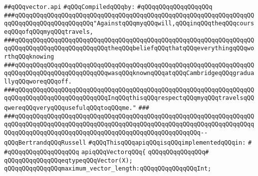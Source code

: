 \label{src/lib/std/src/vector.api}
\verb|##qQQqvector.api|\newline
\newline
\verb|#qQQqCompiledqQQqby:|\newline
\verb|#qQQqqQQqqQQqqQQqqQQq|\newline
\newline
\newline
\newline
\verb|###qQQqqQQqqQQqqQQqqQQqqQQqqQQqqQQqqQQqqQQqqQQqqQQqqQQqqQQqqQQqqQQqqQQqqQQqqQQqqQQqqQQqqQQqqQQq"AgainstqQQqmyqQQqwill,qQQqinqQQqtheqQQqcourseqQQqofqQQqmyqQQqtravels,|\newline
\verb|###qQQqqQQqqQQqqQQqqQQqqQQqqQQqqQQqqQQqqQQqqQQqqQQqqQQqqQQqqQQqqQQqqQQqqQQqqQQqqQQqqQQqqQQqqQQqqQQqtheqQQqbeliefqQQqthatqQQqeverythingqQQqworthqQQqknowing|\newline
\verb|###qQQqqQQqqQQqqQQqqQQqqQQqqQQqqQQqqQQqqQQqqQQqqQQqqQQqqQQqqQQqqQQqqQQqqQQqqQQqqQQqqQQqqQQqqQQqqQQqwasqQQqknownqQQqatqQQqCambridgeqQQqgraduallyqQQqworeqQQqoff.|\newline
\verb|###qQQqqQQqqQQqqQQqqQQqqQQqqQQqqQQqqQQqqQQqqQQqqQQqqQQqqQQqqQQqqQQqqQQqqQQqqQQqqQQqqQQqqQQqqQQqqQQqInqQQqthisqQQqrespectqQQqmyqQQqtravelsqQQqwereqQQqveryqQQqusefulqQQqtoqQQqme."|\newline
\verb|###|\newline
\verb|###qQQqqQQqqQQqqQQqqQQqqQQqqQQqqQQqqQQqqQQqqQQqqQQqqQQqqQQqqQQqqQQqqQQqqQQqqQQqqQQqqQQqqQQqqQQqqQQqqQQqqQQqqQQqqQQqqQQqqQQqqQQqqQQqqQQqqQQqqQQqqQQqqQQqqQQqqQQqqQQqqQQqqQQqqQQqqQQqqQQqqQQqqQQqqQQq--qQQqBertrandqQQqRussell|\newline
\newline
\newline
\verb|#qQQqThisqQQqapiqQQqisqQQqimplementedqQQqin:|\newline
\verb|#|\newline
\verb|#qQQqqQQqqQQqqQQqqQQq|\newline
\newline
\verb|apiqQQqVectorqQQq{|\newline
\verb|qQQqqQQqqQQqqQQq#|\newline
\verb|qQQqqQQqqQQqqQQqeqtypeqQQqVector(X);|\newline
\newline
\verb|qQQqqQQqqQQqqQQqmaximum_vector_length:qQQqqQQqqQQqqQQqInt;|\newline
